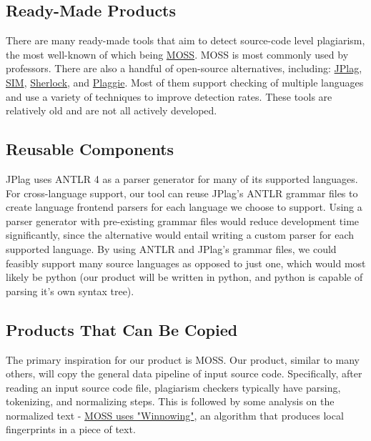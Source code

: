 \documentclass[12pt]{article}
\begin{document}
\subsection{Ready-Made Products}

There are many ready-made tools that aim to detect source-code level plagiarism, the most well-known of which being \href{https://theory.stanford.edu/~aiken/moss/}{MOSS}. MOSS is most commonly used by professors.
There are also a handful of open-source alternatives, including: \href{https://github.com/jplag/JPlag}{JPlag}, \href{https://dickgrune.com/Programs/similarity_tester/}{SIM}, \href{https://warwick.ac.uk/fac/sci/dcs/research/ias/software/sherlock/}{Sherlock}, and \href{https://www.cs.hut.fi/Software/Plaggie/}{Plaggie}.
Most of them support checking of multiple languages and use a variety of techniques to improve detection rates. These tools are relatively old and are not all actively developed.

\subsection{Reusable Components}

JPlag uses ANTLR 4 as a parser generator for many of its supported languages. For cross-language support, our tool can reuse JPlag's ANTLR grammar files to create language frontend parsers for each language we choose to support. Using a parser generator with pre-existing grammar files would reduce development time significantly, since the alternative would entail writing a custom parser for each supported language. By using ANTLR and JPlag's grammar files, we could feasibly support many source languages as opposed to just one, which would most likely be python (our product will be written in python, and python is capable of parsing it's own syntax tree).

\subsection{Products That Can Be Copied}

The primary inspiration for our product is MOSS. Our product, similar to many others, will copy the general data pipeline of input source code. Specifically, after reading an input source code file, plagiarism checkers typically have parsing, tokenizing, and normalizing steps. This is followed by some analysis on the normalized text - \href{https://theory.stanford.edu/~aiken/publications/papers/sigmod03.pdf}{MOSS uses "Winnowing"}, an algorithm that produces local fingerprints in a piece of text.
\end{document}

